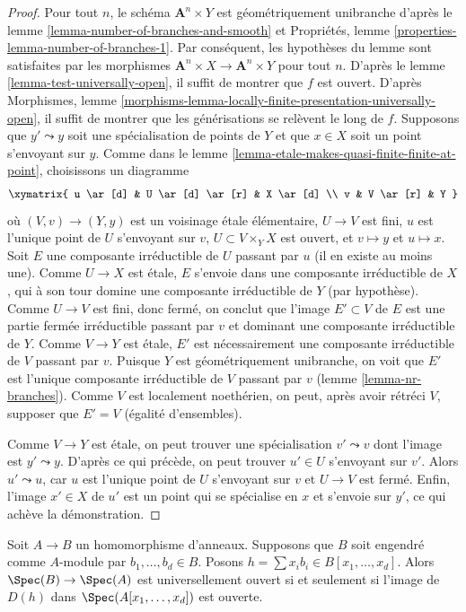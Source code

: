 \begin{proof}
Pour tout $n$, le schéma $\mathbf{A}^n \times Y$ est géométriquement unibranche
d'après le lemme \ref{lemma-number-of-branches-and-smooth} et
Propriétés, lemme \ref{properties-lemma-number-of-branches-1}. Par conséquent,
les hypothèses du lemme sont satisfaites par les morphismes
$\mathbf{A}^n \times X \to \mathbf{A}^n \times Y$ pour tout $n$.
D'après le lemme \ref{lemma-test-universally-open},
il suffit de montrer que $f$ est ouvert. D'après Morphismes, lemme
\ref{morphisms-lemma-locally-finite-presentation-universally-open},
il suffit de montrer que les générisations se relèvent le long de $f$.
Supposons que $y' \leadsto y$ soit une spécialisation de points de
$Y$ et que $x \in X$ soit un point s'envoyant sur $y$.
Comme dans le lemme \ref{lemma-etale-makes-quasi-finite-finite-at-point},
choisissons un diagramme
$$
\xymatrix{
u \ar[d] & U \ar[d] \ar[r] & X \ar[d] \\
v & V \ar[r] & Y
}
$$
où $(V, v) \to (Y, y)$ est un voisinage \'etale élémentaire,
$U \to V$ est fini, $u$ est l'unique point de $U$ s'envoyant sur $v$,
$U \subset V \times_Y X$ est ouvert, et $v \mapsto y$ et $u \mapsto x$.
Soit $E$ une composante irréductible de $U$ passant par $u$
(il en existe au moins une). Comme $U \to X$ est \'etale, $E$
s'envoie dans une composante irréductible de $X$,
qui à son tour domine une composante irréductible de $Y$ (par hypothèse).
Comme $U \to V$ est fini, donc fermé, on conclut que
l'image $E' \subset V$ de $E$ est une partie fermée irréductible
passant par $v$ et dominant une composante irréductible de $Y$.
Comme $V \to Y$ est \'etale, $E'$ est nécessairement une composante irréductible
de $V$ passant par $v$.
Puisque $Y$ est géométriquement unibranche, on voit que $E'$ est l'unique composante irréductible
de $V$ passant par $v$ (lemme \ref{lemma-nr-branches}).
Comme $V$ est localement noethérien, on peut, après avoir rétréci $V$,
supposer que $E' = V$ (égalité d'ensembles).

\medskip\noindent
Comme $V \to Y$ est \'etale, on peut trouver une spécialisation
$v' \leadsto v$ dont l'image est $y' \leadsto y$.
D'après ce qui précède, on peut trouver $u' \in U$ s'envoyant sur $v'$.
Alors $u' \leadsto u$, car $u$ est l'unique point de
$U$ s'envoyant sur $v$ et $U \to V$ est fermé.
Enfin, l'image $x' \in X$ de $u'$ est un point
qui se spécialise en $x$ et s'envoie sur $y'$, ce qui achève la démonstration.
\end{proof}

\begin{lemma}
\label{lemma-characterize-universally-open-finite}
Soit $A \to B$ un homomorphisme d'anneaux. Supposons que $B$ soit engendré comme $A$-module par
$b_1, \ldots, b_d \in B$. Posons $h = \sum x_ib_i \in B[x_1, \ldots, x_d]$.
Alors $\Spec(B) \to \Spec(A)$ est universellement ouvert si et seulement si l'image de
$D(h)$ dans $\Spec(A[x_1, \ldots, x_d])$ est ouverte.
\end{lemma}

